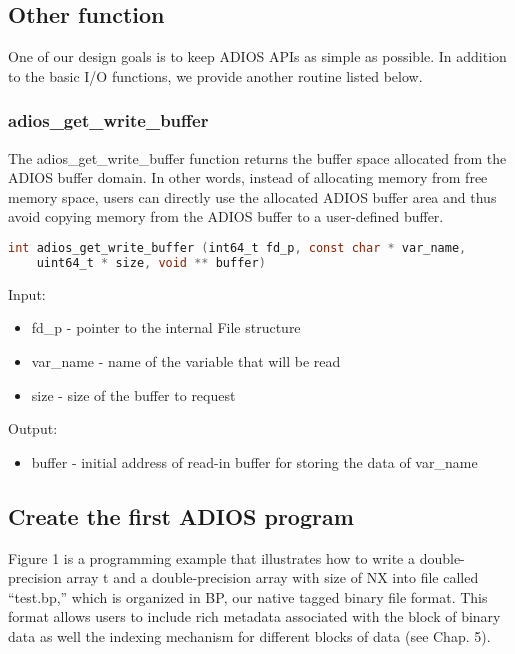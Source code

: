 \subsection{Other function}

One of our design goals is to keep ADIOS APIs as simple as possible. In addition 
to the basic I/O functions, we provide another routine listed below. 

\subsubsection{adios\_get\_write\_buffer}

The adios\_get\_write\_buffer function returns the buffer space allocated from 
the ADIOS buffer domain. In other words, instead of allocating memory from free 
memory space, users can directly use the allocated ADIOS buffer area and thus avoid 
copying memory from the ADIOS buffer to a user-defined buffer.

\begin{lstlisting}[language=C,caption={},label={}]
int adios_get_write_buffer (int64_t fd_p, const char * var_name, 
	uint64_t * size, void ** buffer)
\end{lstlisting}

Input: 
\begin{itemize}
\item fd\_p - pointer to the internal File structure
\item var\_name - name of the variable that will be read
\item size - size of the buffer to request
\end{itemize}

Output: 
\begin{itemize}
\item buffer - initial address of read-in buffer for storing the data of var\_name
\end{itemize}

\subsection{Create the first ADIOS program}

Figure 1 is a programming example that illustrates how to write a double-precision 
array t and a double-precision array with size of NX into file called ``test.bp,'' 
which is organized in BP, our native tagged binary file format. This format allows 
users to include rich metadata associated with the block of binary data as well 
the indexing mechanism for different blocks of data (see Chap. 5). 

